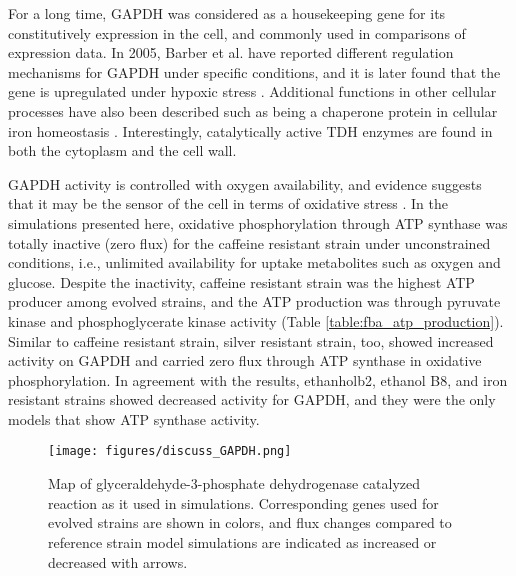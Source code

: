For a long time, GAPDH was considered as a housekeeping gene for its constitutively expression in the cell, and commonly used in comparisons of expression data. In 2005, Barber et al. have reported different regulation mechanisms for GAPDH under specific conditions\cite{barber2005gapdh}, and it is later found that the gene is upregulated under hypoxic stress \cite{yang2008effects}. Additional functions in other cellular processes have also been described such as being a chaperone protein in cellular iron homeostasis \cite{sweeny2018glyceraldehyde}. Interestingly, catalytically active TDH enzymes are found in both the cytoplasm and the cell wall.

GAPDH activity is controlled with oxygen availability, and evidence suggests that it may be the sensor of the cell in terms of oxidative stress \cite{chuang2005glyceraldehyde}. In the simulations presented here, oxidative phosphorylation through ATP synthase was totally inactive (zero flux) for the caffeine resistant strain under unconstrained conditions, i.e., unlimited availability for uptake metabolites such as oxygen and glucose. Despite the inactivity, caffeine resistant strain was the highest ATP producer among evolved strains, and the ATP production was through pyruvate kinase and phosphoglycerate kinase activity (Table \ref{table:fba_atp_production}). Similar to caffeine resistant strain, silver resistant strain, too, showed increased activity on GAPDH and carried zero flux through ATP synthase in oxidative phosphorylation. In agreement with the results, ethanholb2, ethanol B8, and iron resistant strains showed decreased activity for GAPDH, and they were the only models that show ATP synthase activity.

\begin{figure}[H]
\texttt{[image: figures/discuss\_GAPDH.png]}
\caption[Map of glyceraldehyde-3-phosphate dehydrogenase catalyzed reaction as it used in simulations]{Map of glyceraldehyde-3-phosphate dehydrogenase catalyzed reaction as it used in simulations. Corresponding genes used for evolved strains are shown in colors, and flux changes compared to reference strain model simulations are indicated as increased or decreased with arrows.}
\label{fig:discuss_GAPDH}
\end{figure}

\vspace{-1cm}

